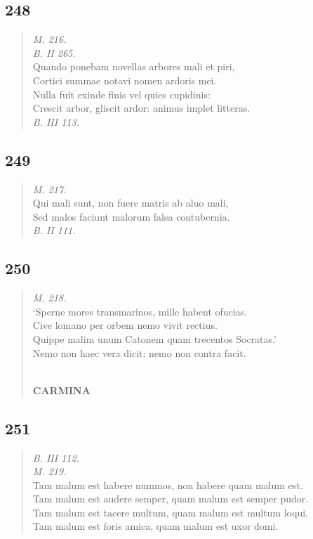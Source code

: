 \documentclass[11pt, a4paper]{report}
\begin{document}
            \subsection*{248}
      \begin{verse}
      \textit{M. 216.} \\ \textit{B. II 265.} \\ Quando ponebam novellas arbores mali et piri, \\ Cortici summae notavi nomen ardoris mei. \\ Nulla fuit exinde finis vel quies cupidinis: \\ Crescit arbor, gliscit ardor: animus implet litteras. \\ \textit{B. III 113.} \\ 
      \end{verse}
  
            \subsection*{249}
      \begin{verse}
      \textit{M. 217.} \\ Qui mali sunt, non fuere matris ab aluo mali, \\ Sed malos faciunt malorum falsa contubernia. \\ \textit{B. II 111.} \\ 
      \end{verse}
  
            \subsection*{250}
      \begin{verse}
      \textit{M. 218.} \\ ‘Sperne mores transmarinos, mille habent ofucias. \\ Cive lomano per orbem nemo vivit rectius. \\ Quippe malim unum Catonem quam trecentos Socratas.’ \\ Nemo non haec vera dicit: nemo non contra facit. \\ 
        ﻿\pagebreak 
    \begin{center} \textbf{CARMINA} \end{center} \marginpar{[202]} 
      \end{verse}
  
            \subsection*{251}
      \begin{verse}
      \textit{B. III 112.} \\ \textit{M. 219.} \\ Tam malum est habere nummos, non habere quam malum est. \\ Tam malum est audere semper, quam malum est semper pudor. \\ Tam malum est tacere multum, quam malum est multum loqui. \\ Tam malum est foris amica, quam malum est uxor domi. \\ 
      \end{verse}
  
\end{document}
